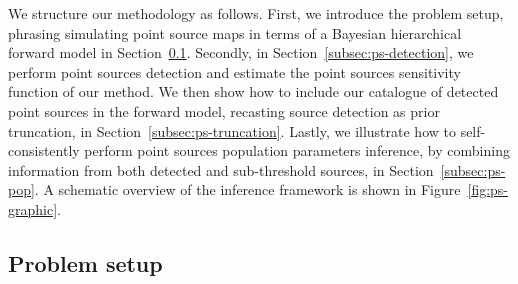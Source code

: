 We structure our methodology as follows. First, we introduce the problem setup, phrasing simulating point source maps in terms of a Bayesian hierarchical forward model in Section~\ref{subsec:ps-sim}. Secondly, in Section~\ref{subsec:ps-detection}, we perform point sources detection and estimate the point sources sensitivity function of our method. We then show how to include our catalogue of detected point sources in the forward model, recasting source detection as prior truncation, in Section~\ref{subsec:ps-truncation}. Lastly, we illustrate how to self-consistently perform point sources population parameters inference, by combining information from both detected and sub-threshold sources, in Section~\ref{subsec:ps-pop}. A schematic overview of the inference framework is shown in Figure~\ref{fig:ps-graphic}.

%  
%  

\subsection{Problem setup} \label{subsec:ps-sim}

